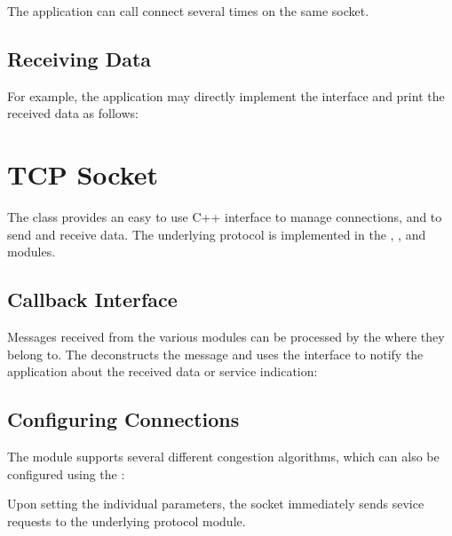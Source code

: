 
The application can call connect several times on the same socket.

\subsection*{Receiving Data}

For example, the application may directly implement the
 interface and print the received data as
follows:


\section{TCP Socket}
\label{sec:sockets:tcp-socket}

The  class provides an easy to use C++ interface to manage
 connections, and to send and receive data. The underlying
 protocol is implemented in the , ,
and  modules.

\subsection*{Callback Interface}

Messages received from the various  modules can be processed by the
 where they belong to. The  deconstructs
the message and uses the  interface to notify the
application about the received data or service indication:


\subsection*{Configuring Connections}

The  module supports several  different congestion
algorithms, which can also be configured using the :


Upon setting the individual parameters, the socket immediately sends sevice
requests to the underlying  protocol module.

